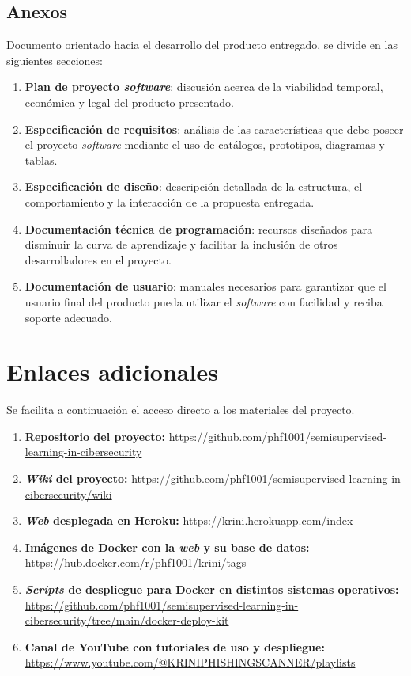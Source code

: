 \subsection{Anexos}

Documento orientado hacia el desarrollo del producto entregado, se divide en las siguientes secciones:

\begin{enumerate}
	\item \textbf{Plan de proyecto \textit{software}}: discusión acerca de la viabilidad temporal, económica y legal del producto presentado.
	\item \textbf{Especificación de requisitos}: análisis de las características que debe poseer el proyecto \textit{software} mediante el uso de catálogos, prototipos, diagramas y tablas.
	\item \textbf{Especificación de diseño}: descripción detallada de la estructura,
	el comportamiento y la interacción de la propuesta entregada.
	\item \textbf{Documentación técnica de programación}: recursos diseñados para disminuir la curva de aprendizaje y facilitar la inclusión de otros desarrolladores en el proyecto.
	\item \textbf{Documentación de usuario}: manuales necesarios para garantizar que el usuario final del producto pueda utilizar el \textit{software} con facilidad y reciba soporte adecuado.
\end{enumerate} 

\section{Enlaces adicionales}

Se facilita a continuación el acceso directo a los materiales del proyecto.

\begin{enumerate}
	\item \textbf{Repositorio del proyecto:}
	\url{https://github.com/phf1001/semisupervised-learning-in-cibersecurity}
	\item \textbf{\textit{Wiki} del proyecto:} 	\url{https://github.com/phf1001/semisupervised-learning-in-cibersecurity/wiki}
	\item \textbf{\textit{Web} desplegada en Heroku:} \url{https://krini.herokuapp.com/index}
	\item \textbf{Imágenes de Docker con la \textit{web} y su base de datos:} \url{https://hub.docker.com/r/phf1001/krini/tags}
	\item \textbf{\textit{Scripts} de despliegue para Docker en distintos sistemas operativos:} \url{https://github.com/phf1001/semisupervised-learning-in-cibersecurity/tree/main/docker-deploy-kit}
	\item \textbf{Canal de YouTube con tutoriales de uso y despliegue:} \url{https://www.youtube.com/@KRINIPHISHINGSCANNER/playlists}
\end{enumerate}